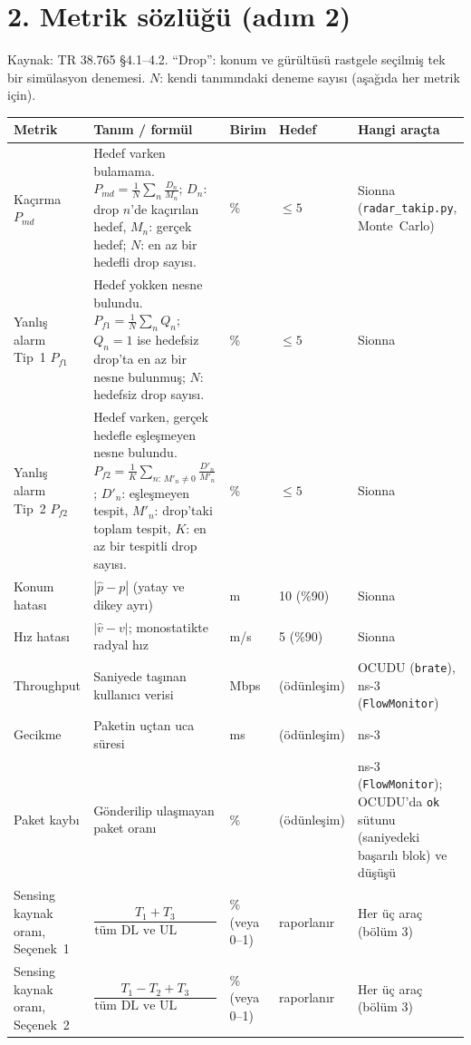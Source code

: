 \documentclass[10.5pt,a4paper]{article}
\begin{document}
\section*{2. Metrik sözlüğü (adım 2)}
Kaynak: TR 38.765 §4.1--4.2. ``Drop'': konum ve gürültüsü rastgele seçilmiş tek bir simülasyon denemesi.
$N$: kendi tanımındaki deneme sayısı (aşağıda her metrik için).

\begingroup\sffamily\small
\begin{xltabular}{\textwidth}{@{}p{2.6cm}p{5.2cm}p{1.2cm}p{1.7cm}X@{}}
\toprule
\textbf{Metrik} & \textbf{Tanım / formül} & \textbf{Birim} & \textbf{Hedef} & \textbf{Hangi araçta} \\
\midrule
Kaçırma $P_{md}$ & Hedef varken bulamama. $P_{md}=\frac{1}{N}\sum_{n}\frac{D_n}{M_n}$; $D_n$: drop $n$'de kaçırılan hedef, $M_n$: gerçek hedef; $N$: en az bir hedefli drop sayısı. & \% & $\le 5$ & Sionna (\texttt{radar\_takip.py}, Monte~Carlo) \\
Yanlış alarm Tip~1 $P_{f1}$ & Hedef yokken nesne bulundu. $P_{f1}=\frac{1}{N}\sum_n Q_n$; $Q_n=1$ ise hedefsiz drop'ta en az bir nesne bulunmuş; $N$: hedefsiz drop sayısı. & \% & $\le 5$ & Sionna \\
Yanlış alarm Tip~2 $P_{f2}$ & Hedef varken, gerçek hedefle eşleşmeyen nesne bulundu. $P_{f2}=\frac{1}{K}\sum_{n:\,M'_n\neq 0}\frac{D'_n}{M'_n}$; $D'_n$: eşleşmeyen tespit, $M'_n$: drop'taki toplam tespit, $K$: en az bir tespitli drop sayısı. & \% & $\le 5$ & Sionna \\
Konum hatası & $|\hat{p}-p|$ (yatay ve dikey ayrı) & m & 10 (\%90) & Sionna \\
Hız hatası & $|\hat{v}-v|$; monostatikte radyal hız & m/s & 5 (\%90) & Sionna \\
Throughput & Saniyede taşınan kullanıcı verisi & Mbps & (ödünleşim) & OCUDU (\texttt{brate}), ns-3 (\texttt{FlowMonitor}) \\
Gecikme & Paketin uçtan uca süresi & ms & (ödünleşim) & ns-3 \\
Paket kaybı & Gönderilip ulaşmayan paket oranı & \% & (ödünleşim) & ns-3 (\texttt{FlowMonitor}); OCUDU'da \texttt{ok} sütunu (saniyedeki başarılı blok) ve düşüşü \\
Sensing kaynak oranı, Seçenek~1 & $\dfrac{T_1+T_3}{\text{tüm DL ve UL kaynak}}$ & \% (veya 0--1) & raporlanır & Her üç araç (bölüm 3) \\
Sensing kaynak oranı, Seçenek~2 & $\dfrac{T_1-T_2+T_3}{\text{tüm DL ve UL kaynak}}$ & \% (veya 0--1) & raporlanır & Her üç araç (bölüm 3) \\
\bottomrule
\end{xltabular}
\endgroup
\end{document}
